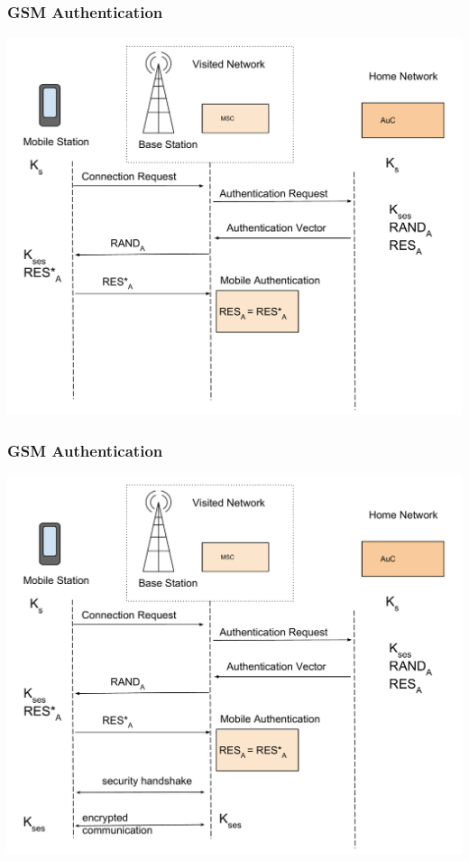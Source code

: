 \documentclass{beamer}
\begin{document}
\begin{frame}
  \frametitle{GSM Authentication}
  \begin{center}
  \includegraphics[width=.9\textwidth, height=.85\textheight]{Images/GSMAuthentication3.pdf}

  \end{center} 
\end{frame}
\begin{frame}
  \frametitle{GSM Authentication}

  \begin{center}
  \includegraphics[width=.9\textwidth, height=.85\textheight]{Images/GSMAuthentication4.pdf}

  \end{center} 
\end{frame}
\end{document}

